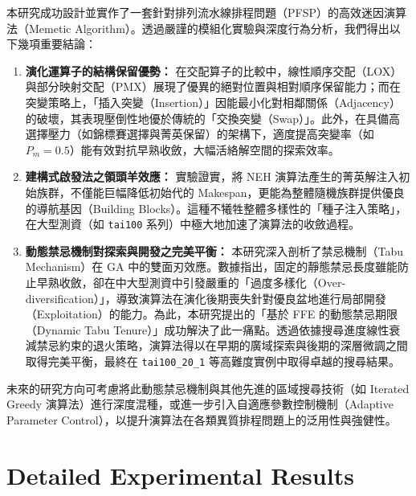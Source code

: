 \documentclass[conference]{IEEEtran}
\begin{document}
本研究成功設計並實作了一套針對排列流水線排程問題（PFSP）的高效迷因演算法（Memetic Algorithm）。透過嚴謹的模組化實驗與深度行為分析，我們得出以下幾項重要結論：

\begin{enumerate}
    \item \textbf{演化運算子的結構保留優勢：} 在交配算子的比較中，線性順序交配（LOX）與部分映射交配（PMX）展現了優異的絕對位置與相對順序保留能力；而在突變策略上，「插入突變（Insertion）」因能最小化對相鄰關係（Adjacency）的破壞，其表現壓倒性地優於傳統的「交換突變（Swap）」。此外，在具備高選擇壓力（如錦標賽選擇與菁英保留）的架構下，適度提高突變率（如 $P_m=0.5$）能有效對抗早熟收斂，大幅活絡解空間的探索效率。
    \item \textbf{建構式啟發法之領頭羊效應：} 實驗證實，將 NEH 演算法產生的菁英解注入初始族群，不僅能巨幅降低初始代的 Makespan，更能為整體隨機族群提供優良的導航基因（Building Blocks）。這種不犧牲整體多樣性的「種子注入策略」，在大型測資（如 \texttt{tai100} 系列）中極大地加速了演算法的收斂過程。
    \item \textbf{動態禁忌機制對探索與開發之完美平衡：} 本研究深入剖析了禁忌機制（Tabu Mechanism）在 GA 中的雙面刃效應。數據指出，固定的靜態禁忌長度雖能防止早熟收斂，卻在中大型測資中引發嚴重的「過度多樣化（Over-diversification）」，導致演算法在演化後期喪失針對優良盆地進行局部開發（Exploitation）的能力。為此，本研究提出的「基於 FFE 的動態禁忌期限（Dynamic Tabu Tenure）」成功解決了此一痛點。透過依據搜尋進度線性衰減禁忌約束的退火策略，演算法得以在早期的廣域探索與後期的深層微調之間取得完美平衡，最終在 \texttt{tai100\_20\_1} 等高難度實例中取得卓越的搜尋結果。
\end{enumerate}

未來的研究方向可考慮將此動態禁忌機制與其他先進的區域搜尋技術（如 Iterated Greedy 演算法）進行深度混種，或進一步引入自適應參數控制機制（Adaptive Parameter Control），以提升演算法在各類異質排程問題上的泛用性與強健性。

\appendices


\section{Detailed Experimental Results}
\end{document}
